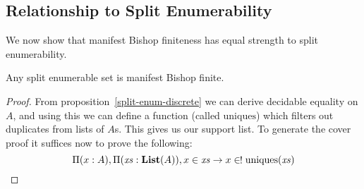 \subsection{Relationship to Split Enumerability}
We now show that manifest Bishop finiteness has equal strength to split
enumerability.
\begin{rm-theorem} \label{split-enum-to-manifest-bishop}
  Any split enumerable set is manifest Bishop finite.
\end{rm-theorem}
\begin{proof}
  From proposition~\ref{split-enum-discrete} we can derive decidable equality on
  \(A\), and using this we can define a function (called \(\text{uniques}\)) which filters
  out duplicates from lists of \(A\)s.
  This gives us our support list.
  To generate the cover proof it suffices now to prove the following:
  \begin{equation}
    \Pi {(x : A)} , \Pi {(\mathit{xs} : \textbf{List}(A))} , x \in \mathit{xs} \rightarrow x \inunique \text{uniques}(\mathit{xs})
  \end{equation}
\end{proof}

